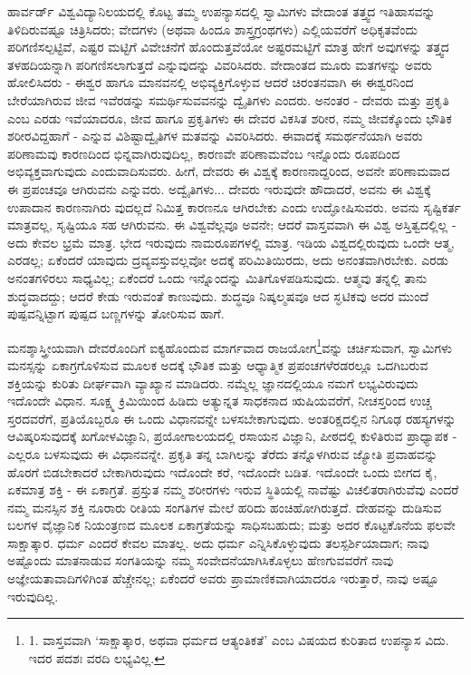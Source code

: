 ಹಾರ್ವರ್ಡ್ ವಿಶ್ವವಿದ್ಯಾನಿಲಯದಲ್ಲಿ ಕೊಟ್ಟ ತಮ್ಮ ಉಪನ್ಯಾಸದಲ್ಲಿ ಸ್ವಾಮಿಗಳು ವೇದಾಂತ ತತ್ತ್ವದ ಇತಿಹಾಸವನ್ನು ತಿಳಿದಿರುವಷ್ಟೂ ಚಿತ್ರಿಸಿದರು; ವೇದಗಳು (ಅಥವಾ ಹಿಂದೂ ಶಾಸ್ತ್ರಗ್ರಂಥಗಳು) ಎಲ್ಲಿಯವರೆಗೆ ಅಧಿಕೃತವೆಂದು ಪರಿಗಣಿಸಲ್ಪಟ್ಟಿವೆ, ಎಷ್ಟರ ಮಟ್ಟಿಗೆ ವಿವೇಚನೆಗೆ ಹೊಂದುತ್ತವೆಯೋ ಅಷ್ಟರಮಟ್ಟಿಗೆ ಮಾತ್ರ ಹೇಗೆ ಅವುಗಳನ್ನು ತತ್ತ್ವದ ತಳಹದಿಯನ್ನಾಗಿ ಪರಿಗಣಿಸಲಾಗುತ್ತದೆ ಎನ್ನುವುದನ್ನು ವಿವರಿಸಿದರು. ವೇದಾಂತದ ಮೂರು ಮತಗಳನ್ನು ಅವರು ಹೋಲಿಸಿದರು - ಈಶ್ವರ ಹಾಗೂ ಮಾನವನಲ್ಲಿ ಅಭಿವ್ಯಕ್ತಿಗೊಳ್ಳುವ ಆದರೆ ಚಿರಂತನವಾಗಿ ಈ ಈಶ್ವರನಿಂದ ಬೇರೆಯಾಗಿರುವ ಜೀವ ಇವೆರಡನ್ನು ಸಮರ್ಥಿಸುವವನನ್ನು ದ್ವೈತಿಗಳು ಎಂದರು. ಅನಂತರ - ದೇವರು ಮತ್ತು ಪ್ರಕೃತಿ ಎಂಬ ಎರಡು ಇವೆಯಾದರೂ, ಜೀವ ಹಾಗೂ ಪ್ರಕೃತಿಗಳು ಈ ದೇವರ ವಿಕಸಿತ ಶರೀರ, ನಮ್ಮ ಜೀವಕ್ಕೊಂದು ಭೌತಿಕ ಶರೀರವಿದ್ದಹಾಗೆ - ಎನ್ನುವ ವಿಶಿಷ್ಟಾದ್ವೈತಿಗಳ ಮತವನ್ನು ವಿವರಿಸಿದರು. ಈವಾದಕ್ಕೆ ಸಮರ್ಥನೆಯಾಗಿ ಅವರು ಪರಿಣಾಮವು ಕಾರಣದಿಂದ ಭಿನ್ನವಾಗಿರುವುದಿಲ್ಲ, ಕಾರಣವೇ ಪರಿಣಾಮವೆಂಬ ಇನ್ನೊಂದು ರೂಪದಿಂದ ಅಭಿವ್ಯಕ್ತವಾಗುವುದು ಎಂದುವಾದಿಸುವರು. ಹೀಗೆ, ದೇವರು ಈ ವಿಶ್ವಕ್ಕೆ ಕಾರಣನಾದ್ದರಿಂದ, ಅವನೇ ಪರಿಣಾಮವಾದ ಈ ಪ್ರಪಂಚವೂ ಆಗಿರುವನು ಎನ್ನುವರು. ಅದ್ವೈತಿಗಳು... ದೇವರು ಇರುವುದೇ ಹೌದಾದರೆ, ಅವನು ಈ ವಿಶ್ವಕ್ಕೆ ಉಪಾದಾನ ಕಾರಣನಾಗಿರು ವುದಲ್ಲದೆ ನಿಮಿತ್ತ ಕಾರಣನೂ ಆಗಿರಬೇಕು ಎಂದು ಉದ್ಘೋಷಿಸುವರು. ಅವನು ಸೃಷ್ಟಿಕರ್ತ ಮಾತ್ರವಲ್ಲ, ಸೃಷ್ಟಿಯೂ ಸಹ ಆಗಿರುವನು. ಈ ವಿಶ್ವವೆಲ್ಲವೂ ಅವನೇ; ಆದರೆ ವಾಸ್ತವವಾಗಿ ಈ ವಿಶ್ವ ಅಸ್ತಿತ್ವದಲ್ಲಿಲ್ಲ - ಅದು ಕೇವಲ ಭ್ರಮೆ ಮಾತ್ರ. ಭೇದ ಇರುವುದು ನಾಮರೂಪಗಳಲ್ಲಿ ಮಾತ್ರ. ಇಡಿಯ ವಿಶ್ವದಲ್ಲಿರುವುದು ಒಂದೇ ಆತ್ಮ, ಎರಡಲ್ಲ; ಏಕೆಂದರೆ ಯಾವುದು ದ್ರವ್ಯವಸ್ತುವಲ್ಲವೋ ಅದಕ್ಕೆ ಪರಿಮಿತಿಯಿರದು, ಅದು ಅನಂತವಾಗಿರಬೇಕು. ಎರಡು ಅನಂತಗಳಿರಲು ಸಾಧ್ಯವಿಲ್ಲ; ಏಕೆಂದರೆ ಒಂದು ಇನ್ನೊಂದನ್ನು ಮಿತಿಗೊಳಪಡಿಸುವುದು. ಆತ್ಮವು ತನ್ನಲ್ಲಿ ತಾನು ಶುದ್ಧವಾದದ್ದು; ಆದರೆ ಕೇಡು ಇರುವಂತೆ ಕಾಣುವುದು. ಶುದ್ಧವೂ ನಿಷ್ಕಲ್ಮಷವೂ ಆದ ಸ್ಘಟಿಕವು ಅದರ ಮುಂದೆ ಪುಷ್ಪವನ್ನಿಟ್ಟಾಗ ಪುಷ್ಪದ ಬಣ್ಣಗಳನ್ನು ತೋರಿಸುವ ಹಾಗೆ.

ಮನಶ್ಶಾಸ್ತ್ರೀಯವಾಗಿ ದೇವರೊಂದಿಗೆ ಐಕ್ಯಹೊಂದುವ ಮಾರ್ಗವಾದ ರಾಜಯೋಗ\footnote{1. ವಾಸ್ತವವಾಗಿ ‘ಸಾಕ್ಷಾತ್ಕಾರ, ಅಥವಾ ಧರ್ಮದ ಆತ್ಯಂತಿಕತೆ’ ಎಂಬ ವಿಷಯದ ಕುರಿತಾದ ಉಪನ್ಯಾಸ ವಿದು. ಇದರ ಪದಶಃ ವರದಿ ಲಭ್ಯವಿಲ್ಲ.}ವನ್ನು ಚರ್ಚಿಸುವಾಗ, ಸ್ವಾಮಿಗಳು ಮನಸ್ಸನ್ನು ಏಕಾಗ್ರಗೊಳಿಸುವ ಮೂಲಕ ಅದಕ್ಕೆ ಭೌತಿಕ ಮತ್ತು ಆಧ್ಯಾತ್ಮಿಕ ಪ್ರಪಂಚಗಳೆರಡರಲ್ಲೂ ಒದಗಿಬರುವ ಶಕ್ತಿಯನ್ನು ಕುರಿತು ದೀರ್ಘವಾಗಿ ವ್ಯಾಖ್ಯಾನ ಮಾಡಿದರು. ನಮ್ಮೆಲ್ಲ ಜ್ಞಾನದಲ್ಲಿಯೂ ನಮಗೆ ಲಭ್ಯವಿರುವುದು ಇದೊಂದೇ ವಿಧಾನ. ಸೂಕ್ಷ್ಮ ಕ್ರಿಮಿಯಿಂದ ಹಿಡಿದು ಅತ್ಯುನ್ನತ ಸಾಧಕನಾದ ಋಷಿಯವರೆಗೆ, ನೀಚಸ್ತರಿಂದ ಉಚ್ಚ ಸ್ತರದವರೆಗೆ, ಪ್ರತಿಯೊಬ್ಬರೂ ಈ ಒಂದು ವಿಧಾನವನ್ನೇ ಬಳಸಬೇಕಾಗುವುದು. ಅಂತರಿಕ್ಷದಲ್ಲಿನ ನಿಗೂಢ ರಹಸ್ಯಗಳನ್ನು ಆವಿಷ್ಕರಿಸುವುದಕ್ಕೆ ಖಗೋಳವಿಜ್ಞಾನಿ, ಪ್ರಯೋಗಾಲಯದಲ್ಲಿ ರಸಾಯನ ವಿಜ್ಞಾನಿ, ಪೀಠದಲ್ಲಿ ಕುಳಿತಿರುವ ಪ್ರಾಧ್ಯಾಪಕ - ಎಲ್ಲರೂ ಬಳಸುವುದು ಈ ವಿಧಾನವನ್ನೇ. ಪ್ರಕೃತಿ ತನ್ನ ಬಾಗಿಲನ್ನು ತೆರೆದು ತನ್ನೊಳಗಿರುವ ಜ್ಯೋತಿ ಪ್ರವಾಹವನ್ನು ಹೊರಗೆ ಬಿಡಬೇಕಾದರೆ ಬೇಕಾಗಿರುವುದು ಇದೊಂದೇ ಕರೆ, ಇದೊಂದೇ ಬಡಿತ. ಇದೊಂದೇ ಒಂದು ಬೀಗದ ಕೈ, ಏಕಮಾತ್ರ ಶಕ್ತಿ - ಈ ಏಕಾಗ್ರತೆ. ಪ್ರಸ್ತುತ ನಮ್ಮ ಶರೀರಗಳು ಇರುವ ಸ್ಥಿತಿಯಲ್ಲಿ ನಾವೆಷ್ಟು ವಿಚಲಿತರಾಗಿರುವೆವು ಎಂದರೆ ನಮ್ಮ ಮನಸ್ಸಿನ ಶಕ್ತಿ ನೂರಾರು ರೀತಿಯ ಸಂಗತಿಗಳ ಮೇಲೆ ಹರಿದು ಹಂಚಿಹೋಗಿರುತ್ತದೆ. ದೇಹವನ್ನು ದುಡಿಸುವ ಬಲಗಳ ವೈಜ್ಞಾನಿಕ ನಿಯಂತ್ರಣದ ಮೂಲಕ ಏಕಾಗ್ರತೆಯನ್ನು ಸಾಧಿಸಬಹುದು; ಮತ್ತು ಅದರ ಕೊಟ್ಟಕೊನೆಯ ಫಲವೇ ಸಾಕ್ಷಾತ್ಕಾರ. ಧರ್ಮ ಎಂದರೆ ಕೇವಲ ಮಾತಲ್ಲ. ಅದು ಧರ್ಮ ಎನ್ನಿಸಿಕೊಳ್ಳುವುದು ತಲಸ್ಪರ್ಶಿಯಾದಾಗ; ನಾವು ಅಷ್ಟೊಂದು ಮಾತನಾಡುವ ಸಂಗತಿಯನ್ನು ನಮ್ಮ ಸಂವೇದನೆಯಾಗಿಸಿಕೊಳ್ಳಲು ಹೆಣಗುವವರೆಗೆ ನಾವು ಅಜ್ಞೇಯತಾವಾದಿಗಳಿಗಿಂತ ಹೆಚ್ಚೇನಲ್ಲ; ಏಕೆಂದರೆ ಅವರು ಪ್ರಾಮಾಣಿಕವಾಗಿಯಾದರೂ ಇರುತ್ತಾರೆ, ನಾವು ಅಷ್ಟೂ ಇರುವುದಿಲ್ಲ.

